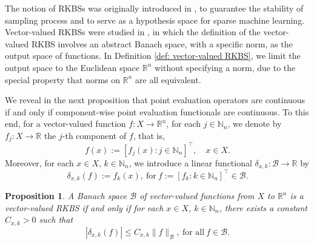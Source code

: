 \documentclass[11pt]{article}
\newtheorem{proposition}[theorem]{Proposition}
\begin{document}
The notion of RKBSs was originally introduced in \cite{zhang2009reproducing}, to guarantee the stability of sampling process and to serve as a hypothesis space for sparse machine learning. Vector-valued RKBSs were studied in \cite{lin2021multi, zhang2013vector}, in which the definition of the vector-valued RKBS involves an abstract Banach space, with a specific norm, as the output space of functions. In Definition \ref{def: vector-valued RKBS}, we limit the output space to the Euclidean space $\mathbb{R}^n$ without specifying a norm, due to the special property that norms on $\mathbb{R}^n$ are all equivalent. 


%
We reveal in the next proposition that point evaluation operators are continuous if and only if component-wise point evaluation functionals are continuous. To this end, for a vector-valued function $f:X\to\mathbb{R}^n$, for each $j\in\mathbb{N}_n$, we denote by $f_j:X\to\mathbb{R}$ the $j$-th component of $f$, that is, 
\begin{equation*}
    f({x}):=[f_j({x}):j\in\mathbb{N}_n]^\top,\quad {x}\in X. 
\end{equation*}
Moreover, for each $x\in X$, $k\in\mathbb{N}_n$, we introduce a linear functional $\delta_{{x},k}:\mathcal{B}\to\mathbb{R}$ by 
\begin{equation*}
    \delta_{{x},k}(f):=f_k({x}),\ \mbox{for}\  f:=[f_k:k\in\mathbb{N}_n]^{\top}\in\mathcal{B}. 
\end{equation*}
\begin{proposition}\label{prop: component wise for vector-valued RKBS}
    A Banach space $\mathcal{B}$ of vector-valued functions from $X$ to $\mathbb{R}^n$ is a vector-valued RKBS if and only if for each ${x}\in X$, $k\in \mathbb{N}_n$, there exists a constant $C_{{x},k}>0$ such that 
    \begin{equation}\label{elementwise functionals}
        |\delta_{{x},k}(f)|\leq C_{{x},k}\|f\|_{\mathcal{B}}, \ \mbox{for all} \ f\in \mathcal{B}.
    \end{equation}
\end{proposition}
\end{document}
